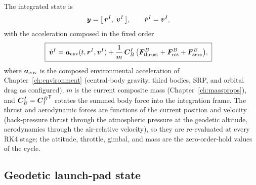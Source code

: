 The integrated state is
\begin{equation}
  \bm{y} = \bigl[\, \bm{r}^{I},\; \bm{v}^{I} \,\bigr],
  \qquad
  \dot{\bm{r}}^{I} = \bm{v}^{I},
  \label{eq:vehicle6dof:state}
\end{equation}
with the acceleration composed in the fixed order
\begin{equation}
  \boxed{\;
  \dot{\bm{v}}^{I}
    = \bm{a}_{\mathrm{env}}(t, \bm{r}^{I}, \bm{v}^{I})
    + \frac{1}{m}\,\bm{C}_{B}^{I}\,
      \bigl( \bm{F}_{\mathrm{thrust}}^{B}
           + \bm{F}_{\mathrm{rcs}}^{B}
           + \bm{F}_{\mathrm{aero}}^{B} \bigr),
  \;}
  \label{eq:vehicle6dof:transaccel}
\end{equation}
where $\bm{a}_{\mathrm{env}}$ is the composed environmental acceleration of
Chapter~\ref{ch:environment} (central-body gravity, third bodies, SRP, and
orbital drag as configured), $m$ is the current composite mass
(Chapter~\ref{ch:massprops}), and $\bm{C}_{B}^{I} = {\bm{C}_{I}^{B}}^{\mathsf T}$
rotates the summed body force into the integration frame. The thrust and
aerodynamic forces are functions of the current position and velocity
(back-pressure thrust through the atmospheric pressure at the geodetic
altitude, aerodynamics through the air-relative velocity), so they are
re-evaluated at every RK4 stage; the attitude, throttle, gimbal, and mass are
the zero-order-hold values of the cycle.

\subsection{Geodetic launch-pad state}

